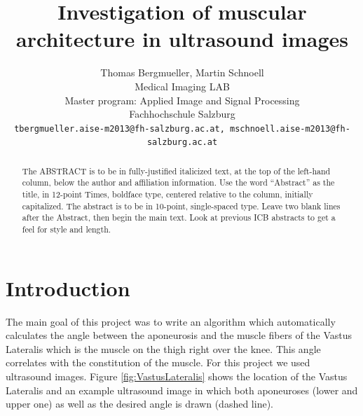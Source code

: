 \documentclass[10pt,twocolumn,letterpaper]{article}
\begin{document}
\title{Investigation of muscular architecture in ultrasound images}

\author{Thomas Bergmueller, Martin Schnoell\\
Medical Imaging LAB\\
Master program: Applied Image and Signal Processing\\
Fachhochschule Salzburg\\
{\tt\small tbergmueller.aise-m2013@fh-salzburg.ac.at, mschnoell.aise-m2013@fh-salzburg.ac.at}
}

\maketitle
\thispagestyle{empty}

\begin{abstract}
   The ABSTRACT is to be in fully-justified italicized text, at the top
   of the left-hand column, below the author and affiliation
   information. Use the word ``Abstract'' as the title, in 12-point
   Times, boldface type, centered relative to the column, initially
   capitalized. The abstract is to be in 10-point, single-spaced type.
   Leave two blank lines after the Abstract, then begin the main text.
   Look at previous ICB abstracts to get a feel for style and length.
\end{abstract}


\section{Introduction}
The main goal of this project was to write an algorithm which automatically calculates the angle between the aponeurosis and the muscle fibers of the Vastus Lateralis which is the muscle on the thigh right over the knee. This angle correlates with the constitution of the muscle.
For this project we used ultrasound images.  
Figure \ref{fig:VastusLateralis} shows the location of the Vastus Lateralis and an example ultrasound image in which both aponeuroses (lower and upper one) as well as the desired angle is drawn (dashed line).
\end{document}
